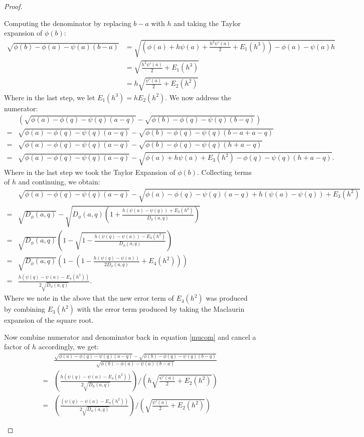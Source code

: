 \documentclass[11pt]{myclass}
\newcommand{\breg}{\ensuremath{D_\phi}}
\begin{document}
\begin{proof}
\begin{description}
Computing the denominator by replacing $b-a$ with $h$ and taking the Taylor expansion of $\phi(b)$:
\begin{align*}
	\sqrt{ \phi(b) - \phi(a) - \psi(a)(b-a)}
   &= \sqrt{\left(\phi(a) + h \psi(a) + \frac{h^2 \psi'(a)}{2} +E_1(h^3)\right) - \phi(a) -  \psi(a) h } 
\\ &= \sqrt{\frac{h^2 \psi'(a)}{2} + E_1(h^3)}  
\\ &= h \sqrt{\frac{\psi'(a)}{2} + E_2(h^2)} 
\end{align*}
Where in the last step, we let $E_1(h^3) = h E_2(h^2)$.
We now address the numerator:
\begin{align*}
 &\left(\sqrt{\phi(a) - \phi(q) - \psi(q)(a-q) }  - \sqrt{\phi(b) - \phi(q) - \psi(q)(b-q)} \right) 
 \\ =&  \sqrt{\phi(a) - \phi(q) - \psi(q)(a-q) }  - \sqrt{\phi(b) - \phi(q) - \psi(q)(b-a + a -q)}
 \\ =& \sqrt{\phi(a) - \phi(q) - \psi(q)(a-q) }  - \sqrt{\phi(b) - \phi(q) - \psi(q)(h + a -q)}
 \\  =& \sqrt{\phi(a) - \phi(q) - \psi(q)(a-q) }  - \sqrt{\phi(a) + h \psi(a) + E_3(h^2) - \phi(q) - \psi(q)(h + a -q)}.
\end{align*}
Where in the last step we took the Taylor Expansion of $\phi(b)$. Collecting terms of $h$ and continuing, we obtain:
\begin{align*} 
& \sqrt{\phi(a) - \phi(q) - \psi(q)(a-q) }  - \sqrt{\phi(a) - \phi(q) - \psi(q)(a -q) + h(\psi(a) - \psi(q)) + E_3(h^2)} 
\\ =& \sqrt{\breg(a,q)} - \sqrt{\breg(a,q) \left(1 + \frac{h(\psi(a) - \psi(q)) + E_3(h^2)}{\breg(a,q)} \right)}
\\ =&  \sqrt{\breg(a,q)} \left(1 - \sqrt{ 1 - \frac{h(\psi(q) - \psi(a))- E_3(h^2)}{\breg(a,q)}} \right) 
\\ =&  \sqrt{\breg(a,q)} \left(1 -  \left(1 - \frac{h(\psi(q) - \psi(a))}{2 \breg(a,q)} + E_4(h^2)\right) \right)
\\ =&  \frac{h \left(\psi(q) - \psi(a) - E_4(h^2)\right)}{2 \sqrt{\breg(a,q)}}. 
\end{align*}
Where we note in the above that the new error term of $E_4(h^2)$ was produced by combining $E_3(h^2)$ with the error term
produced by taking the Maclaurin expansion of the square root.


Now combine numerator and denominator back in equation \ref{mucom} and cancel a factor of $h$ accordingly, we get:
\begin{align*}  
&\frac{ \sqrt{\phi(a) - \phi(q) - \psi(q)(a-q) }  - \sqrt{\phi(b) - \phi(q) - \psi(q)(b-q)}}{\sqrt{ \phi(b) - \phi(a) - \psi(a)(b-a)}} \\
=& \left(\frac{h \left(\psi(q) - \psi(a) - E_4(h^2)\right)}{2 \sqrt{\breg(a,q)}} \right) / \left(h \sqrt{\frac{\psi'(a)}{2} + E_2(h^2)} \right) \\
=&  \left(\frac{ \left(\psi(q) - \psi(a) - E_4(h^2)\right)}{2 \sqrt{\breg(a,q)}} \right) / \left( \sqrt{\frac{\psi'(a)}{2} + E_2(h^2)} \right)
\end{align*}


\end{description}
\end{proof}
\end{document}
